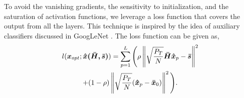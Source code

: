 \documentclass[conference]{IEEEtran}
\begin{document}
To avoid the vanishing gradients, the sensitivity to initialization, and the saturation of activation functions, we leverage a loss function that covers the output from all the layers. This technique is inspired by the idea of auxiliary classifiers discussed in GoogLeNet \cite{7298594}. The loss function can be given as,%
\begin{multline}
l( \boldsymbol{x}_{opt} ; \boldsymbol{\hat{x}} \boldsymbol{(\bar{H},\bar{s})}) = \sum_{p=1}^L \Bigg( \Bigg.\rho\left\lVert\sqrt{\frac{P_T}{N}}\boldsymbol{\bar{H}}\boldsymbol{\hat{x}}_{p}-\boldsymbol{\bar{s}}\right\rVert^{2} \\ + (1 - \rho)\left\lVert\sqrt{\frac{P_T}{N}}(\boldsymbol{\hat{x}}_{p} - \boldsymbol{\bar{x}}_{0})\right\rVert^{2}\Bigg. \Bigg).\label{eq:13}  
\end{multline}

\end{document}
